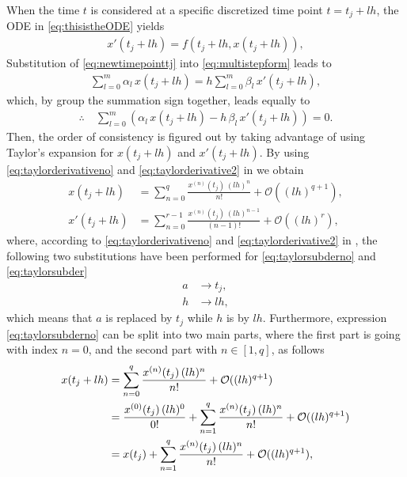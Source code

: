 \documentclass[12pt]{article}
\begin{document}
When the time $t$ is considered at a specific discretized time point $t=t_j+lh$, the ODE in \eqref{eq:thisistheODE} yields 
\begin{align}
	\label{eq:newtimepointtj}
	x'(t_j+lh) = f(t_j+lh,x(t_j+lh)),
\end{align}
Substitution of \eqref{eq:newtimepointtj} into \eqref{eq:multistepform} leads to 
\begin{align}
	\sum_{l=0}^{{m}}\alpha_l\,x(t_j+lh) = h\sum_{l=0}^{m}\beta_l\,x'(t_j+lh),
\end{align}
which, by group the summation sign together, leads equally to
\begin{align}
	\label{eq:myform}
	\therefore\quad\boxed{
	\sum_{l=0}^{{m}}\left( \alpha_l\,x(t_j+lh) - h\,\beta_l\,x'(t_j+lh) \right) = 0.
	}
\end{align}
Then, the order of consistency is figured out by taking advantage of using Taylor's expansion for 
$x(t_j+lh)$ and $x'(t_j+lh)$. 
By using 
\eqref{eq:taylorderivativeno} and
\eqref{eq:taylorderivative2} in
 we obtain 
\begin{align}
	x(t_j+lh)  & = \sum_{n=0}^{q} \frac{x^{(n)}(t_j)\,(lh)^{n}}{n!} + \mathcal{O}((lh)^{q+1}),
	\label{eq:taylorsubderno}
	\\
	x'(t_j+lh) & = \sum_{n=0}^{r-1} \frac{x^{(n)}(t_j)\,(lh)^{n-1}}{(n-1)!} + \mathcal{O}((lh)^{r}),
	\label{eq:taylorsubder}
\end{align}
where, according to 
\eqref{eq:taylorderivativeno} and
\eqref{eq:taylorderivative2} in
,
the following two substitutions have been performed
for 
\eqref{eq:taylorsubderno} and 
\eqref{eq:taylorsubder}
\begin{align}
	a & \rightarrow t_j, \\
	h & \rightarrow lh, 
\end{align}
which means that $a$ is replaced by $t_j$ while $h$ is by $lh$.
Furthermore, expression \eqref{eq:taylorsubderno} can be split into two main parts, 
where the first part is going with 
index $n=0$, and the second part with $n \in [1,q]$, as follows
\begin{align}
	x(t_j+lh) 
	 & = \sum_{n=0}^{q} \frac{x^{(n)}(t_j)\,(lh)^{n}}{n!} + \mathcal{O}((lh)^{q+1}) \notag    \\
	 & = \frac{x^{(0)}(t_j)\,(lh)^{0}}{0!}
	+ \sum_{n=1}^{q} \frac{x^{(n)}(t_j)\,(lh)^{n}}{n!}
	+ \mathcal{O}((lh)^{q+1}) \notag                                                          \\
	 & = x(t_j) + \sum_{n=1}^{q} \frac{x^{(n)}(t_j)\,(lh)^{n}}{n!} + \mathcal{O}((lh)^{q+1}),
\end{align}
\end{document}
